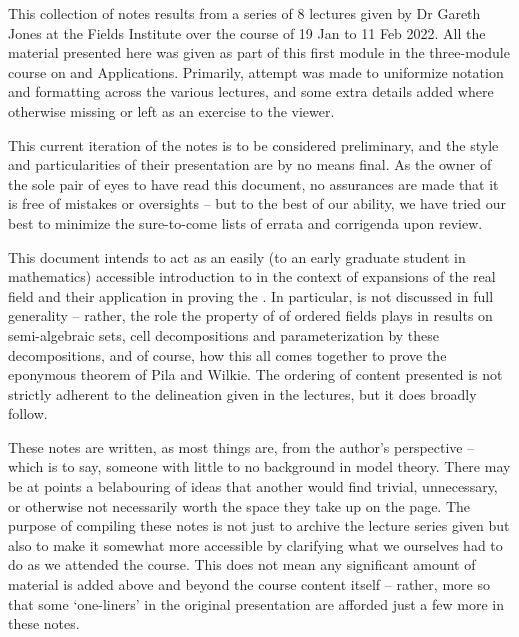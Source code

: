 %
%

\preface

This collection of notes results from a series of 8 lectures given by Dr Gareth Jones at the Fields Institute over the course of 19 Jan to 11 Feb 2022. All the material presented here was given as part of this first module in the three-module course on \Omy and Applications. Primarily, attempt was made to uniformize notation and formatting across the various lectures, and some extra details added where otherwise missing or left as an exercise to the viewer.

This current iteration of the notes is to be considered preliminary, and the style and particularities of their presentation are by no means final. As the owner of the sole pair of eyes to have read this document, no assurances are made that it is free of mistakes or oversights -- but to the best of our ability, we have tried our best to minimize the sure-to-come lists of errata and corrigenda upon review.
 
This document intends to act as an easily (to an early graduate student in mathematics) accessible introduction to \omy in the context of expansions of the real field and their application in proving the \pwt. In particular, \omy is not discussed in full generality -- rather, the role the property of \omy of ordered fields plays in results on semi-algebraic sets, cell decompositions and parameterization by these decompositions, and of course, how this all comes together to prove the eponymous theorem of Pila and Wilkie. The ordering of content presented is not strictly adherent to the delineation given in the lectures, but it does broadly follow.

These notes are written, as most things are, from the author's perspective -- which is to say, someone with little to no background in model theory. There may be at points a belabouring of ideas that another would find trivial, unnecessary, or otherwise not necessarily worth the space they take up on the page. The purpose of compiling these notes is not just to archive the lecture series given but also to make it somewhat more accessible by clarifying what we ourselves had to do as we attended the course. This does not mean any significant amount of material is added above and beyond the course content itself -- rather, more so that some `one-liners' in the original presentation are afforded just a few more in these notes.

